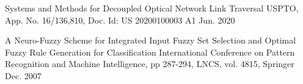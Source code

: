 


\begin{cventries}
  \pubentry
    {Systems and Methods for Decoupled Optical Network Link Traversal}
    {USPTO, App. No. 16/136,810, Doc. Id: US 20200100003 A1} %
    {Jun. 2020} %

\end{cventries}




\begin{cventries}
  \pubentry
    {A Neuro-Fuzzy Scheme for Integrated Input Fuzzy Set Selection and Optimal Fuzzy Rule Generation for Classification} %
    {International Conference on Pattern Recognition and Machine Intelligence, pp 287-294, LNCS, vol. 4815, Springer}
    {Dec. 2007} %

\end{cventries}
